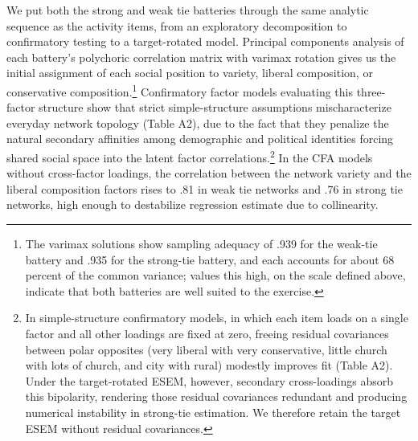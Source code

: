 \documentclass[
  12pt
]{article}
\begin{document}
We put both the strong and weak tie batteries through the same analytic sequence as the activity items, from an exploratory decomposition to confirmatory testing to a target-rotated model. Principal components analysis of each battery's polychoric correlation matrix with varimax rotation gives us the initial assignment of each social position to variety, liberal composition, or conservative composition.\footnote{The varimax solutions show sampling adequacy of .939 for the weak-tie battery and .935 for the strong-tie battery, and each accounts for about 68 percent of the common variance; values this high, on the scale defined above, indicate that both batteries are well suited to the exercise.} Confirmatory factor models evaluating this three-factor structure show that strict simple-structure assumptions mischaracterize everyday network topology (Table A2), due to the fact that they penalize the natural secondary affinities among demographic and political identities forcing shared social space into the latent factor correlations.\footnote{In simple-structure confirmatory models, in which each item loads on a single factor and all other loadings are fixed at zero, freeing residual covariances between polar opposites (very liberal with very conservative, little church with lots of church, and city with rural) modestly improves fit (Table A2). Under the target-rotated ESEM, however, secondary cross-loadings absorb this bipolarity, rendering those residual covariances redundant and producing numerical instability in strong-tie estimation. We therefore retain the target ESEM without residual covariances.} In the CFA models without cross-factor loadings, the correlation between the network variety and the liberal composition factors rises to .81 in weak tie networks and .76 in strong tie networks, high enough to destabilize regression estimate due to collinearity. 
\end{document}
